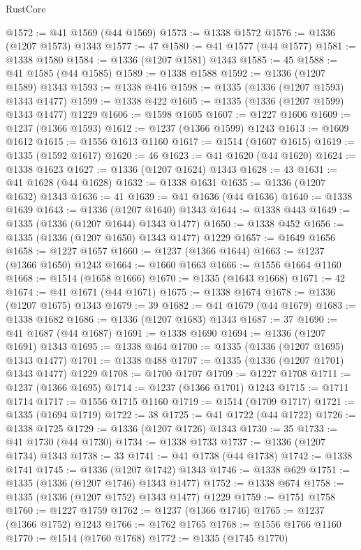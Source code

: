 \begin{lexlean}{RustCore}
\begin{coremodule}
@1572 := @41 @1569 (@44 @1569)
@1573 := @1338 @1572
@1576 := @1336 (@1207 @1573) @1343
@1577 := 47
@1580 := @41 @1577 (@44 @1577)
@1581 := @1338 @1580
@1584 := @1336 (@1207 @1581) @1343
@1585 := 45
@1588 := @41 @1585 (@44 @1585)
@1589 := @1338 @1588
@1592 := @1336 (@1207 @1589) @1343
@1593 := @1338 @416
@1598 := @1335 (@1336 (@1207 @1593) @1343 @1477)
@1599 := @1338 @422
@1605 := @1335 (@1336 (@1207 @1599) @1343 @1477) @1229
@1606 := @1598 @1605
@1607 := @1227 @1606
@1609 := @1237 (@1366 @1593)
@1612 := @1237 (@1366 @1599) @1243
@1613 := @1609 @1612
@1615 := @1556 @1613 @1160
@1617 := @1514 (@1607 @1615)
@1619 := @1335 (@1592 @1617)
@1620 := 46
@1623 := @41 @1620 (@44 @1620)
@1624 := @1338 @1623
@1627 := @1336 (@1207 @1624) @1343
@1628 := 43
@1631 := @41 @1628 (@44 @1628)
@1632 := @1338 @1631
@1635 := @1336 (@1207 @1632) @1343
@1636 := 41
@1639 := @41 @1636 (@44 @1636)
@1640 := @1338 @1639
@1643 := @1336 (@1207 @1640) @1343
@1644 := @1338 @443
@1649 := @1335 (@1336 (@1207 @1644) @1343 @1477)
@1650 := @1338 @452
@1656 := @1335 (@1336 (@1207 @1650) @1343 @1477) @1229
@1657 := @1649 @1656
@1658 := @1227 @1657
@1660 := @1237 (@1366 @1644)
@1663 := @1237 (@1366 @1650) @1243
@1664 := @1660 @1663
@1666 := @1556 @1664 @1160
@1668 := @1514 (@1658 @1666)
@1670 := @1335 (@1643 @1668)
@1671 := 42
@1674 := @41 @1671 (@44 @1671)
@1675 := @1338 @1674
@1678 := @1336 (@1207 @1675) @1343
@1679 := 39
@1682 := @41 @1679 (@44 @1679)
@1683 := @1338 @1682
@1686 := @1336 (@1207 @1683) @1343
@1687 := 37
@1690 := @41 @1687 (@44 @1687)
@1691 := @1338 @1690
@1694 := @1336 (@1207 @1691) @1343
@1695 := @1338 @464
@1700 := @1335 (@1336 (@1207 @1695) @1343 @1477)
@1701 := @1338 @488
@1707 := @1335 (@1336 (@1207 @1701) @1343 @1477) @1229
@1708 := @1700 @1707
@1709 := @1227 @1708
@1711 := @1237 (@1366 @1695)
@1714 := @1237 (@1366 @1701) @1243
@1715 := @1711 @1714
@1717 := @1556 @1715 @1160
@1719 := @1514 (@1709 @1717)
@1721 := @1335 (@1694 @1719)
@1722 := 38
@1725 := @41 @1722 (@44 @1722)
@1726 := @1338 @1725
@1729 := @1336 (@1207 @1726) @1343
@1730 := 35
@1733 := @41 @1730 (@44 @1730)
@1734 := @1338 @1733
@1737 := @1336 (@1207 @1734) @1343
@1738 := 33
@1741 := @41 @1738 (@44 @1738)
@1742 := @1338 @1741
@1745 := @1336 (@1207 @1742) @1343
@1746 := @1338 @629
@1751 := @1335 (@1336 (@1207 @1746) @1343 @1477)
@1752 := @1338 @674
@1758 := @1335 (@1336 (@1207 @1752) @1343 @1477) @1229
@1759 := @1751 @1758
@1760 := @1227 @1759
@1762 := @1237 (@1366 @1746)
@1765 := @1237 (@1366 @1752) @1243
@1766 := @1762 @1765
@1768 := @1556 @1766 @1160
@1770 := @1514 (@1760 @1768)
@1772 := @1335 (@1745 @1770)

\end{coremodule}
\end{lexlean}
